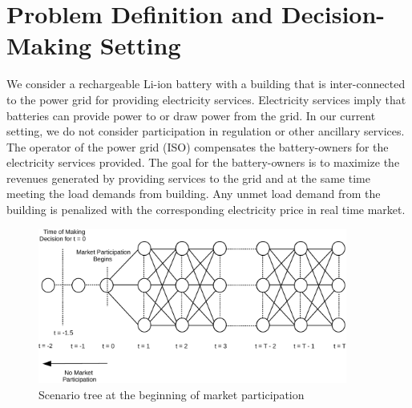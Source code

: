 \documentclass[11pt,twoside]{article}
\begin{document}
\section{Problem Definition and Decision-Making Setting}\label{sec:setting}
We consider a rechargeable Li-ion battery with a building that is inter-connected to the power grid for providing electricity services. Electricity services imply that batteries can provide power to or draw power from the grid. In our current setting, we do not consider participation in regulation or other ancillary services. The operator of the power grid (ISO) compensates the battery-owners for the electricity services provided. The goal for the battery-owners is to maximize the revenues generated by providing services to the grid and at the same time meeting the load demands from building. Any unmet load demand from the building is penalized with the corresponding electricity price in real time market.\\
\begin{figure}[h!]
\begin{center}
\includegraphics[width=4in]{Figures/scenario_tree-crop.pdf} \caption{Scenario tree at the beginning of market participation}\label{scenario_tree}\end{center}
\end{figure}
\end{document}
